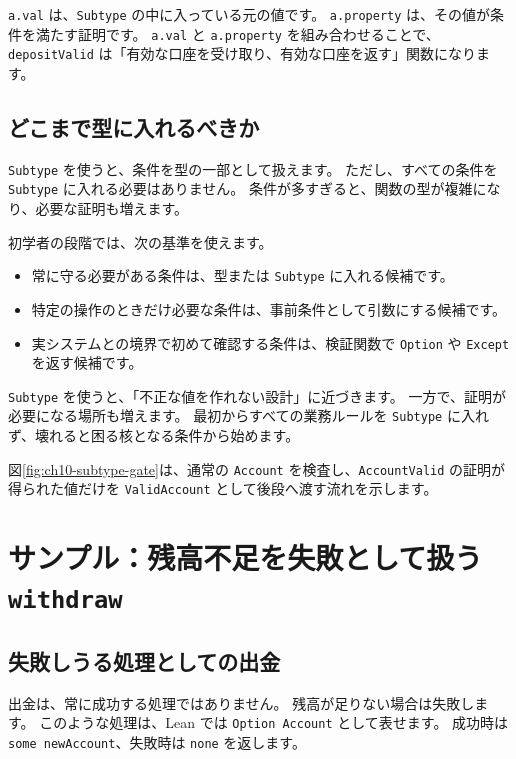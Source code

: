 \texttt{a.val} は、\texttt{Subtype} の中に入っている元の値です。
\texttt{a.property} は、その値が条件を満たす証明です。
\texttt{a.val} と \texttt{a.property} を組み合わせることで、\texttt{depositValid} は「有効な口座を受け取り、有効な口座を返す」関数になります。

\subsection{どこまで型に入れるべきか}

\texttt{Subtype} を使うと、条件を型の一部として扱えます。
ただし、すべての条件を \texttt{Subtype} に入れる必要はありません。
条件が多すぎると、関数の型が複雑になり、必要な証明も増えます。

初学者の段階では、次の基準を使えます。

\begin{itemize}
\item 常に守る必要がある条件は、型または \texttt{Subtype} に入れる候補です。
\item 特定の操作のときだけ必要な条件は、事前条件として引数にする候補です。
\item 実システムとの境界で初めて確認する条件は、検証関数で \texttt{Option} や \texttt{Except} を返す候補です。
\end{itemize}

\texttt{Subtype} を使うと、「不正な値を作れない設計」に近づきます。
一方で、証明が必要になる場所も増えます。
最初からすべての業務ルールを \texttt{Subtype} に入れず、壊れると困る核となる条件から始めます。

図\ref{fig:ch10-subtype-gate}は、通常の \texttt{Account} を検査し、\texttt{AccountValid} の証明が得られた値だけを \texttt{ValidAccount} として後段へ渡す流れを示します。


\section{サンプル：残高不足を失敗として扱う \texttt{withdraw}}

\subsection{失敗しうる処理としての出金}

出金は、常に成功する処理ではありません。
残高が足りない場合は失敗します。
このような処理は、Lean では \texttt{Option Account} として表せます。
成功時は \texttt{some newAccount}、失敗時は \texttt{none} を返します。

